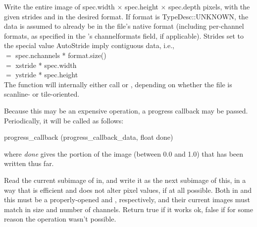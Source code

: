 \apiend


Write the entire image of {\kw spec.width} $\times$ {\kw spec.height}
$\times$ {\kw spec.depth}
pixels, with the given strides and in the desired format.
If {\cf format} is {\cf TypeDesc::UNKNOWN}, the data is assumed to
already be in the file's native format (including per-channel formats, 
as specified in the \ImageSpec's {\cf channelformats} field, if applicable).
Strides set to the special value {\kw AutoStride} imply contiguous data,
i.e., \\
 $=$ {\kw spec.nchannels * format.size()} \\
 $=$ {\kw xstride * spec.width} \\
 $=$ {\kw ystride * spec.height}\\
The function will internally either call \writescanline or 
\writetile, depending on whether the file is scanline- or
tile-oriented.

Because this may be an expensive operation, a progress callback may be passed.
Periodically, it will be called as follows:
\begin{code}
        progress_callback (progress_callback_data, float done)
\end{code}
\noindent where \emph{done} gives the portion of the image 
(between 0.0 and 1.0) that has been written thus far.

\apiend


Read the current subimage of {\cf in}, and write it as the next subimage
of {\cf *this}, in a way that is efficient and does not alter pixel
values, if at all possible.  Both {\cf in} and {\cf this} must be a
properly-opened \ImageInput and \ImageOutput, respectively, and their
current images must match in size and number of channels.  Return {\cf true}
if it works ok, {\cf false} if for some reason the operation wasn't possible.

